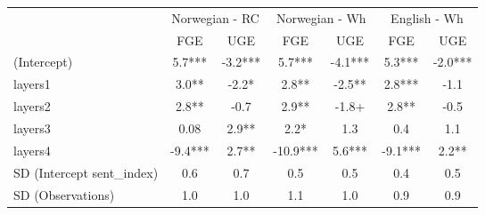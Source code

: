 \begin{longtable}{lcccccc}
\toprule
 & \multicolumn{2}{c}{Norwegian - RC} & \multicolumn{2}{c}{Norwegian - Wh} & \multicolumn{2}{c}{English - Wh} \\ 
\cmidrule(lr){2-3} \cmidrule(lr){4-5} \cmidrule(lr){6-7}
  & FGE & UGE & FGE & UGE & FGE & UGE \\ 
\midrule\addlinespace[2.5pt]
(Intercept) & 5.7*** & -3.2*** & 5.7*** & -4.1*** & 5.3*** & -2.0*** \\ 
layers1 & 3.0** & -2.2* & 2.8** & -2.5** & 2.8*** & -1.1 \\ 
layers2 & 2.8** & -0.7 & 2.9** & -1.8+ & 2.8** & -0.5 \\ 
layers3 & 0.08 & 2.9** & 2.2* & 1.3 & 0.4 & 1.1 \\ 
layers4 & -9.4*** & 2.7** & -10.9*** & 5.6*** & -9.1*** & 2.2** \\ 
SD (Intercept sent\_index) & 0.6 & 0.7 & 0.5 & 0.5 & 0.4 & 0.5 \\ 
SD (Observations) & 1.0 & 1.0 & 1.1 & 1.0 & 0.9 & 0.9 \\ 
\bottomrule
\end{longtable}

